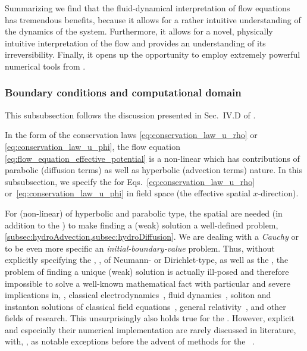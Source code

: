 Summarizing we find that the fluid-dynamical interpretation of flow equations has tremendous benefits, because it allows for a rather intuitive understanding of the dynamics of the system. Furthermore, it allows for a novel, physically intuitive interpretation of the \frg{} flow and provides an understanding of its irreversibility.
Finally, it opens up the opportunity to employ extremely powerful numerical tools from \cfd{}.

\subsubsection{Boundary conditions and computational domain}\label{subsec:boundary_conditions_finite_volume}
\begin{disclaimer}
	This subsubsection follows the discussion presented in Sec.~IV.D of .
\end{disclaimer}
In the form of the conservation laws \eqref{eq:conservation_law_u_rho} or \eqref{eq:conservation_law_u_phi}, the \frg{} flow equation \eqref{eq:flow_equation_effective_potential} is a non-linear \pde{} which has contributions of parabolic (diffusion terms) as well as hyperbolic (advection terms) nature.
In this subsubsection, we specify the \bcs{} for Eqs.~\eqref{eq:conservation_law_u_rho} or~\eqref{eq:conservation_law_u_phi} in field space (the effective spatial $x$-direction).

For (non-linear) \pdes{} of hyperbolic and parabolic type, the spatial \bcs{} are needed (in addition to the \ic{}) to make finding a (weak) solution a well-defined problem, \cf{} \cref{subsec:hydroAdvection,subsec:hydroDiffusion}.
We are dealing with a \textit{Cauchy} or to be even more specific an \textit{initial-boundary-value} problem.
Thus, without explicitly specifying the \bcs{}, \eg{}, of Neumann- or Dirichlet-type, as well as the \ics{}, the problem of finding a unique (weak) solution is actually ill-posed and therefore impossible to solve \dash{} a well-known mathematical fact with particular and severe implications in, \eg{}, classical electrodynamics~\cite{Jackson:1998nia}, fluid dynamics~\cite{BuckleyLeverett:1942}, soliton and instanton solutions of classical field equations~\cite{Rajaraman:1982is,Shifman:1994ee}, general relativity~\cite{Weinberg:1972kfs,Misner:1974qy,Ryder:2009zz}, and other fields of research.
This \dash{} unsurprisingly \dash{} also holds true for the \frg{}. 
However, explicit \bcs{} and especially their numerical implementation are rarely discussed in \frg{} literature, with, \eg{},  as notable exceptions before the advent of \cfd{} methods for the \frg{}~\cite{Grossi:2019urj,zerod1,zerod2,zerod3,Ihssen2020,Stoll:2021ori,Grossi:2021ksl,Ihssen:2022xkr,Ihssen:2023nqd,Ihssen:2023xlp}.


